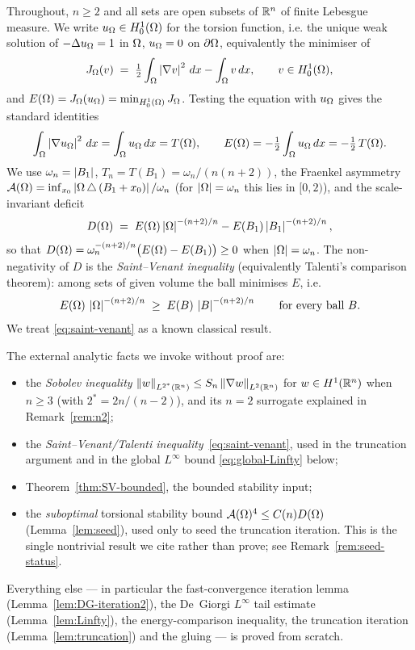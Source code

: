 Throughout, $n\ge2$ and all sets are open subsets of $\mathbb{R}^n$ of finite
Lebesgue measure. We write $u_\Omega\in H^1_0(\Omega)$ for the torsion
function, i.e. the unique weak solution of $-\Delta u_\Omega=1$ in $\Omega$,
$u_\Omega=0$ on $\partial\Omega$, equivalently the minimiser of
\begin{equation}\label{eq:energy-def}
   J_\Omega(v)\;=\;\tfrac12\int_\Omega\left|\nabla v\right|^2\,dx-\int_\Omega v\,dx,
   \qquad v\in H^1_0(\Omega),
\end{equation}
and $E(\Omega)=J_\Omega(u_\Omega)=\min_{H^1_0(\Omega)}J_\Omega$. Testing the equation
with $u_\Omega$ gives the standard identities
\begin{equation}\label{eq:energy-identities}
   \int_\Omega\left|\nabla u_\Omega\right|^2\,dx=\int_\Omega u_\Omega\,dx=T(\Omega),
   \qquad
   E(\Omega)=-\tfrac12\int_\Omega u_\Omega\,dx=-\tfrac12\,T(\Omega).
\end{equation}
We use $\omega_n=\left|B_1\right|$, $T_n=T(B_1)=\omega_n/(n(n+2))$, the Fraenkel
asymmetry $\mathcal{A}(\Omega)=\inf_{x_0}\left|\Omega\,\triangle\,(B_1+x_0)\right|/\omega_n$
(for $\left|\Omega\right|=\omega_n$ this lies in $[0,2)$), and the scale-invariant
deficit
\begin{equation}\label{eq:deficit-def}
   D(\Omega)\;=\;E(\Omega)\left|\Omega\right|^{-(n+2)/n}-E(B_1)\left|B_1\right|^{-(n+2)/n},
\end{equation}
so that $D(\Omega)=\omega_n^{-(n+2)/n}\bigl(E(\Omega)-E(B_1)\bigr)\ge0$ when
$\left|\Omega\right|=\omega_n$. The non-negativity of $D$ is the
\emph{Saint--Venant inequality} (equivalently Talenti's comparison
theorem): among sets of given volume the ball minimises $E$, i.e.
\begin{equation}\label{eq:saint-venant}
   E(\Omega)\,\left|\Omega\right|^{-(n+2)/n}\;\ge\;E(B)\,\left|B\right|^{-(n+2)/n}
   \qquad\text{for every ball }B.
\end{equation}
We treat \eqref{eq:saint-venant} as a known classical result.

The external analytic facts we invoke without proof are:
\begin{itemize}
\item the \emph{Sobolev inequality}
   $\left\|w\right\|_{L^{2^*}(\mathbb{R}^n)}\le S_n\left\|\nabla w\right\|_{L^2(\mathbb{R}^n)}$ for
   $w\in H^1(\mathbb{R}^n)$ when $n\ge3$ (with $2^*=2n/(n-2)$), and its $n=2$
   surrogate explained in Remark~\ref{rem:n2};
\item the \emph{Saint--Venant/Talenti inequality}~\eqref{eq:saint-venant},
   used in the truncation argument and in the global $L^\infty$ bound
   \eqref{eq:global-Linfty} below;
\item Theorem~\ref{thm:SV-bounded}, the bounded stability input;
\item the \emph{suboptimal} torsional stability bound
   $\mathcal{A}(\Omega)^4\le C(n)D(\Omega)$ (Lemma~\ref{lem:seed}), used only to seed
   the truncation iteration. This is the single nontrivial result we cite
   rather than prove; see Remark~\ref{rem:seed-status}.
\end{itemize}
Everything else --- in particular the fast-convergence iteration lemma
(Lemma~\ref{lem:DG-iteration2}), the De~Giorgi $L^\infty$ tail estimate
(Lemma~\ref{lem:Linfty}), the energy-comparison inequality, the truncation
iteration (Lemma~\ref{lem:truncation}) and the gluing --- is proved from
scratch.

